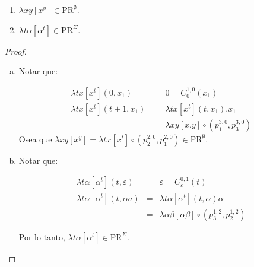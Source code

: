   \begin{lemma}
    \begin{enumerate}
      \item $\lambda xy \left[x^{y}\right] \in \mathrm{PR}^{\emptyset}$.
      \item $\lambda t\alpha \left[\alpha^{t}\right] \in \mathrm{PR}^{\Sigma}$.
    \end{enumerate}
  \end{lemma}
  \begin{proof}
    \begin{enumerate}[a)]
      \item Notar que:

        \begin{eqnarray*}
          \lambda tx \left[x^{t}\right](0, x_{1}) &=& 0 = C_{0}^{1,0}(x_{1}) \\
          \lambda tx \left[x^{t}\right](t+1, x_{1}) &=& \lambda tx \left[x^{t}\right](t, x_{1}) . x_{1} \\
          &=& \lambda xy \left[x.y\right] \circ (p_{1}^{3,0}, p_{3}^{3,0})
        \end{eqnarray*}
        \PN Osea que $\lambda xy \left[x^{y}\right] = \lambda tx \left[x^{t}\right] \circ (p_{2}^{2, 0}, p_{1}^{2, 0})
        \in \mathrm{PR}^{\emptyset}$.

      \item Notar que:

      \begin{eqnarray*}
        \lambda t\alpha \left[\alpha^{t}\right](t, \varepsilon) &=& \varepsilon = C_{\varepsilon}^{0,1}(t) \\
        \lambda t\alpha \left[\alpha^{t}\right](t, \alpha a) &=& \lambda t\alpha \left[\alpha^{t}\right](t,
          \alpha) \alpha \\
        &=& \lambda \alpha\beta \left[\alpha\beta \right] \circ \left(p_{3}^{1,2}, p_{2}^{1,2}\right)
      \end{eqnarray*}

      \PN Por lo tanto, $\lambda t\alpha \left[\alpha^{t}\right] \in \mathrm{PR}^{\Sigma}$.
    \end{enumerate}
  \end{proof}

